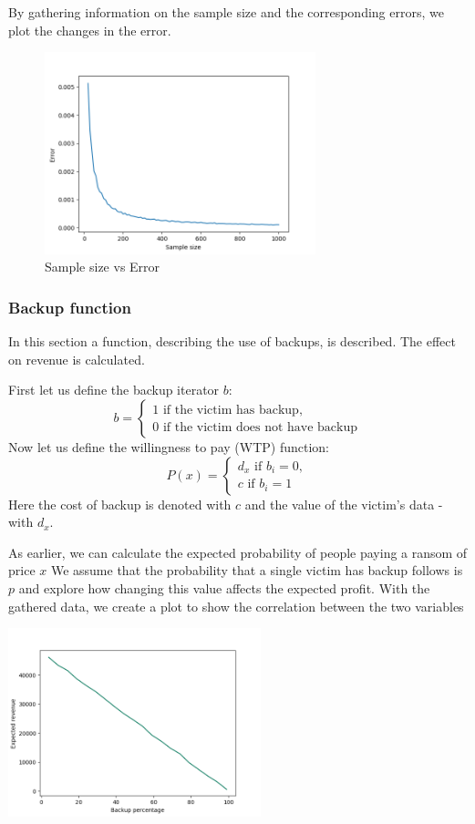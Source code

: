 \documentclass[11pt, a4paper]{article}
\theoremstyle{definition}
\begin{document}
			By gathering information on the sample size and the corresponding errors, we plot the changes in the error.
			\begin{figure}[H]
			\begin{minipage}{1.0\textwidth}
				\centering
				\includegraphics[width=0.7\textwidth]{"Error vs sample size 4"}
				\caption{Sample size vs Error}\label{Fig:Data5}
			\end{minipage}
			\end{figure}
			\subsubsection{Backup function}
				In this section a function, describing the use of backups, is described. The effect on revenue is calculated.\par
				First let us define the backup iterator $b$: 
			$$
			b=
			\begin{cases}
				1 \text{ if the victim has backup},\\
				0 \text{ if the victim does not have backup}
			\end{cases}
			$$
			Now let us define the willingness to pay (WTP) function:
			$$
			P(x)=
			\begin{cases}
			d_{x} \text{ if } b_{i}=0,\\
			c \text{ if } b_{i}=1
			\end{cases}
			$$
				Here the cost of backup is denoted with $c$ and the value of the victim's data - with $d_{x}$.\par
				As earlier, we can calculate the expected probability of people paying a ransom of price $x$
				We assume that the probability that a single victim has backup follows is $p$ and explore how changing this value affects the expected profit. With the gathered data, we create a plot to show the correlation between the two variables
			\begin{center}
				\includegraphics[width=0.55\textwidth]{Revenue_vs_backup}
			\end{center}
\end{document}
